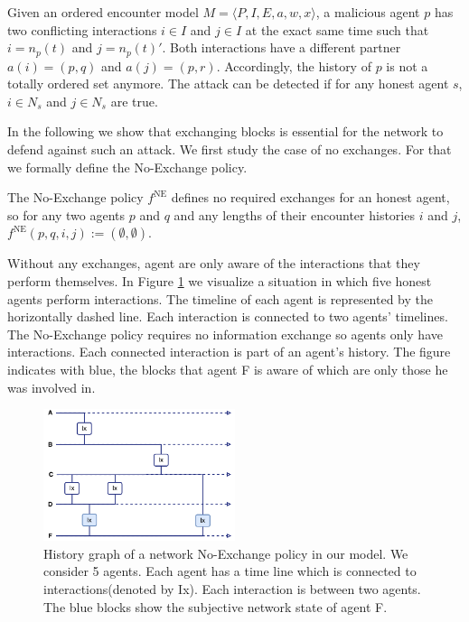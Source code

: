 \begin{defn}
    \label{def:double_spend}
    Given an ordered encounter model $M = \langle P, I, E, a, w, x \rangle$, a malicious agent $p$ has two conflicting interactions 
    $i \in I$ and $j \in I$ at the exact same time such that $i = n_p(t)$ and $j = n_p(t)'$. Both interactions have a different partner $a(i) = (p, q)$ 
    and $a(j) = (p, r)$. Accordingly, the history  of $p$ is not a totally ordered set anymore.
    The attack can be detected if for any honest agent $s$, $i \in N_{s}$ and $j \in N_{s}$ are
    true.
\end{defn}

In the following we show that exchanging blocks is essential for the network to defend against such an 
attack. We first study the case of no exchanges. For that we formally define the No-Exchange policy.

\begin{pol}[No-Exchange]
    \label{pol:no-exchange}
    The No-Exchange policy $f^{\text{NE}}$ defines no required exchanges for an honest agent, so for 
    any two agents $p$ and $q$ and any lengths of their encounter histories $i$ and $j$, 
     $f^{\text{NE}}(p,q,i,j) := (\emptyset, \emptyset)$.
\end{pol}

Without any exchanges, agent are only aware of the interactions that they perform themselves. In
Figure \ref{fig:no_exchange_policy} we visualize a situation in which five honest agents perform interactions. 
The timeline of each agent is represented by the horizontally dashed line. Each interaction is 
connected to two agents' timelines. The No-Exchange policy requires no information exchange so agents only have
interactions. Each connected interaction is part of an agent's history. The figure indicates with 
blue, the blocks that agent F is aware of which are only those he was involved in.

\begin{figure}
    \centering
    \includegraphics[width=0.5\textwidth]{images/no_exchange_policy.pdf}
    \caption{History graph of a network  No-Exchange policy in our model. We consider 5 agents. Each agent has a time
    line which is connected to interactions(denoted by Ix). Each interaction is between two agents. 
    The blue blocks show the subjective network state of agent F.}
    \label{fig:no_exchange_policy}
\end{figure}

